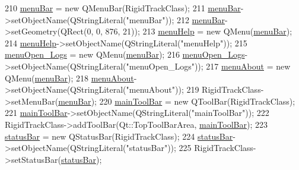 \begin{DoxyCode}
210         \hyperlink{class_ui___rigid_track_class_ae5991e1872fe74ac542cf0fdca8d4d0e}{menuBar} = \textcolor{keyword}{new} QMenuBar(RigidTrackClass);
211         \hyperlink{class_ui___rigid_track_class_ae5991e1872fe74ac542cf0fdca8d4d0e}{menuBar}->setObjectName(QStringLiteral(\textcolor{stringliteral}{"menuBar"}));
212         \hyperlink{class_ui___rigid_track_class_ae5991e1872fe74ac542cf0fdca8d4d0e}{menuBar}->setGeometry(QRect(0, 0, 876, 21));
213         \hyperlink{class_ui___rigid_track_class_a2df43c6bb7db7e366a64bc8dbbbab7cc}{menuHelp} = \textcolor{keyword}{new} QMenu(\hyperlink{class_ui___rigid_track_class_ae5991e1872fe74ac542cf0fdca8d4d0e}{menuBar});
214         \hyperlink{class_ui___rigid_track_class_a2df43c6bb7db7e366a64bc8dbbbab7cc}{menuHelp}->setObjectName(QStringLiteral(\textcolor{stringliteral}{"menuHelp"}));
215         \hyperlink{class_ui___rigid_track_class_a1df91ff9df043558cf6d3c1dd6557250}{menuOpen\_Logs} = \textcolor{keyword}{new} QMenu(\hyperlink{class_ui___rigid_track_class_ae5991e1872fe74ac542cf0fdca8d4d0e}{menuBar});
216         \hyperlink{class_ui___rigid_track_class_a1df91ff9df043558cf6d3c1dd6557250}{menuOpen\_Logs}->setObjectName(QStringLiteral(\textcolor{stringliteral}{"menuOpen\_Logs"}));
217         \hyperlink{class_ui___rigid_track_class_a4c36fbc72f56540b472d7a8724690896}{menuAbout} = \textcolor{keyword}{new} QMenu(\hyperlink{class_ui___rigid_track_class_ae5991e1872fe74ac542cf0fdca8d4d0e}{menuBar});
218         \hyperlink{class_ui___rigid_track_class_a4c36fbc72f56540b472d7a8724690896}{menuAbout}->setObjectName(QStringLiteral(\textcolor{stringliteral}{"menuAbout"}));
219         RigidTrackClass->setMenuBar(\hyperlink{class_ui___rigid_track_class_ae5991e1872fe74ac542cf0fdca8d4d0e}{menuBar});
220         \hyperlink{class_ui___rigid_track_class_abb7105788d67491618ebd4229964f992}{mainToolBar} = \textcolor{keyword}{new} QToolBar(RigidTrackClass);
221         \hyperlink{class_ui___rigid_track_class_abb7105788d67491618ebd4229964f992}{mainToolBar}->setObjectName(QStringLiteral(\textcolor{stringliteral}{"mainToolBar"}));
222         RigidTrackClass->addToolBar(Qt::TopToolBarArea, \hyperlink{class_ui___rigid_track_class_abb7105788d67491618ebd4229964f992}{mainToolBar});
223         \hyperlink{class_ui___rigid_track_class_ac1ced4ae725bc0095307704d5d4fc4f2}{statusBar} = \textcolor{keyword}{new} QStatusBar(RigidTrackClass);
224         \hyperlink{class_ui___rigid_track_class_ac1ced4ae725bc0095307704d5d4fc4f2}{statusBar}->setObjectName(QStringLiteral(\textcolor{stringliteral}{"statusBar"}));
225         RigidTrackClass->setStatusBar(\hyperlink{class_ui___rigid_track_class_ac1ced4ae725bc0095307704d5d4fc4f2}{statusBar});

\end{DoxyCode}
